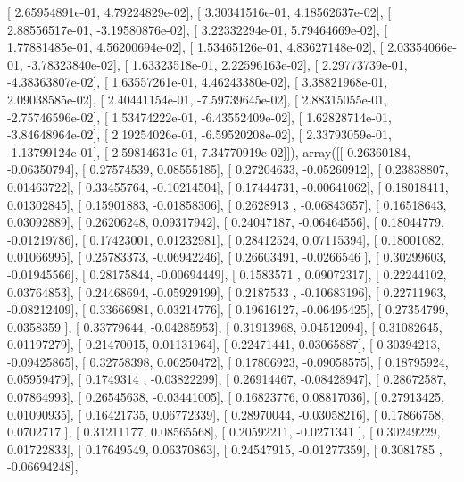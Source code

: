 \documentclass{article}
\begin{document}
       [  2.65954891e-01,   4.79224829e-02],
       [  3.30341516e-01,   4.18562637e-02],
       [  2.88556517e-01,  -3.19580876e-02],
       [  3.22332294e-01,   5.79464669e-02],
       [  1.77881485e-01,   4.56200694e-02],
       [  1.53465126e-01,   4.83627148e-02],
       [  2.03354066e-01,  -3.78323840e-02],
       [  1.63323518e-01,   2.22596163e-02],
       [  2.29773739e-01,  -4.38363807e-02],
       [  1.63557261e-01,   4.46243380e-02],
       [  3.38821968e-01,   2.09038585e-02],
       [  2.40441154e-01,  -7.59739645e-02],
       [  2.88315055e-01,  -2.75746596e-02],
       [  1.53474222e-01,  -6.43552409e-02],
       [  1.62828714e-01,  -3.84648964e-02],
       [  2.19254026e-01,  -6.59520208e-02],
       [  2.33793059e-01,  -1.13799124e-01],
       [  2.59814631e-01,   7.34770919e-02]]), array([[ 0.26360184, -0.06350794],
       [ 0.27574539,  0.08555185],
       [ 0.27204633, -0.05260912],
       [ 0.23838807,  0.01463722],
       [ 0.33455764, -0.10214504],
       [ 0.17444731, -0.00641062],
       [ 0.18018411,  0.01302845],
       [ 0.15901883, -0.01858306],
       [ 0.2628913 , -0.06843657],
       [ 0.16518643,  0.03092889],
       [ 0.26206248,  0.09317942],
       [ 0.24047187, -0.06464556],
       [ 0.18044779, -0.01219786],
       [ 0.17423001,  0.01232981],
       [ 0.28412524,  0.07115394],
       [ 0.18001082,  0.01066995],
       [ 0.25783373, -0.06942246],
       [ 0.26603491, -0.0266546 ],
       [ 0.30299603, -0.01945566],
       [ 0.28175844, -0.00694449],
       [ 0.1583571 ,  0.09072317],
       [ 0.22244102,  0.03764853],
       [ 0.24468694, -0.05929199],
       [ 0.2187533 , -0.10683196],
       [ 0.22711963, -0.08212409],
       [ 0.33666981,  0.03214776],
       [ 0.19616127, -0.06495425],
       [ 0.27354799,  0.0358359 ],
       [ 0.33779644, -0.04285953],
       [ 0.31913968,  0.04512094],
       [ 0.31082645,  0.01197279],
       [ 0.21470015,  0.01131964],
       [ 0.22471441,  0.03065887],
       [ 0.30394213, -0.09425865],
       [ 0.32758398,  0.06250472],
       [ 0.17806923, -0.09058575],
       [ 0.18795924,  0.05959479],
       [ 0.1749314 , -0.03822299],
       [ 0.26914467, -0.08428947],
       [ 0.28672587,  0.07864993],
       [ 0.26545638, -0.03441005],
       [ 0.16823776,  0.08817036],
       [ 0.27913425,  0.01090935],
       [ 0.16421735,  0.06772339],
       [ 0.28970044, -0.03058216],
       [ 0.17866758,  0.0702717 ],
       [ 0.31211177,  0.08565568],
       [ 0.20592211, -0.0271341 ],
       [ 0.30249229,  0.01722833],
       [ 0.17649549,  0.06370863],
       [ 0.24547915, -0.01277359],
       [ 0.3081785 , -0.06694248],
\end{document}
